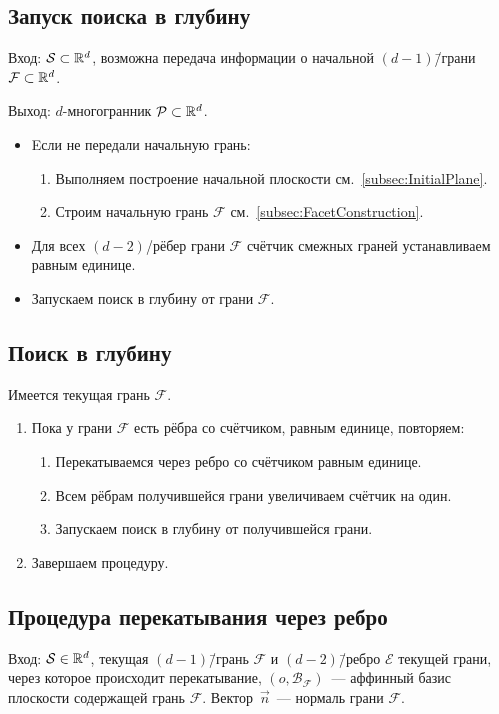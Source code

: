 \documentclass[a4paper,12pt]{article}
\newcommand{\R}[1][]{%
  \ifthenelse{\equal{#1}{}}%
  {\mathbb{R}}%
  {\mathbb{R}^{#1}}}
\newcommand{\Swarm}{\mathcal{S}}              %
\newcommand{\Polyhedron}{\mathcal{P}}         %
\newcommand{\Facet}{\mathcal{F}}              %
\newcommand{\Edge}{\mathcal{E}}               %
\newcommand{\Basis}{\mathcal{B}}              %
\renewcommand{\.}{\hspace{0.2ex}}
\begin{document}
  \subsection{Запуск поиска в глубину}

    Вход: $\Swarm \subset \R[d]$, возможна передача информации о начальной $(d-1)$\=/грани $\Facet \subset \R[d]$.

    Выход: $d$-многогранник $\Polyhedron \subset \R[d]$.

    \begin{itemize}
      \item Eсли не передали начальную грань:
      \begin{enumerate}
        \item Выполняем построение начальной плоскости см.~\ref{subsec:InitialPlane}.
        \item Строим начальную грань $\Facet$ см.~\ref{subsec:FacetConstruction}.
      \end{enumerate}
      \item Для всех $(d-2)$\-/рёбер грани $\Facet$ счётчик смежных граней устанавливаем равным единице.
      \item Запускаем поиск в глубину от грани $\Facet$.
    \end{itemize}




  \subsection{Поиск в глубину}

    Имеется текущая грань $\Facet$.
    \begin{enumerate}
      \item Пока у грани $\Facet$ есть рёбра со счётчиком, равным единице, повторяем:
      \begin{enumerate}
        \item Перекатываемся через ребро со счётчиком равным единице.
        \item Всем рёбрам получившейся грани увеличиваем счётчик на один.
        \item Запускаем поиск в глубину от получившейся грани.
      \end{enumerate}
      \item Завершаем процедуру.
    \end{enumerate}

  \subsection{Процедура перекатывания через ребро}
    Вход: $\Swarm \in \R[d]$, текущая $(d-1)$\=/грань $\Facet$ и $(d-2)$\=/ребро $\Edge$ текущей грани, через которое происходит перекатывание, $(o, \Basis_{\Facet})$~--- аффинный базис плоскости содержащей грань $\Facet$. Вектор~$\vec n$~--- нормаль грани $\Facet$.
\end{document}
